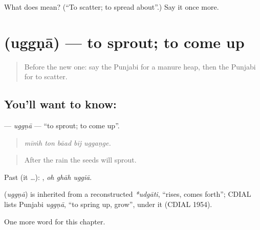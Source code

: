 \begin{tcolorbox}[breakable,colback=teal!4,colframe=teal!35!black,title={Before you move on}]
What does  mean? (\textquotedblleft{}To scatter; to spread about\textquotedblright{}.) Say it once more.
\end{tcolorbox}
\section[\texorpdfstring{\pa{ਉੱਗਣਾ} (uggṇā)}{ਉੱਗਣਾ (uggṇā)}]{ (uggṇā) — to sprout; to come up}

\label{lesson:PA-C302-uggna}



\begin{quote}
Before the new one: say the Punjabi for a manure heap, then the Punjabi for to scatter.
\end{quote}

\subsection*{You'll want to know: }
\textbf{} — \emph{uggṇā} — \textquotedblleft{}to sprout; to come up\textquotedblright{}.

\begin{quote}
    
\end{quote}

\begin{quote}
\emph{mīṁh ton bāad bīj uggaṇge.}
\end{quote}

\begin{quote}
After the rain the seeds will sprout.
\end{quote}

Past (it …):   , \emph{oh ghāh uggiā}.

\begin{cousinweb}
\textbf{} (\emph{uggṇā}) is inherited from a reconstructed \emph{*udgāti}, \textquotedblleft{}rises, comes forth\textquotedblright{}; CDIAL lists Punjabi \emph{uggṇā}, \textquotedblleft{}to spring up, grow\textquotedblright{}, under it (CDIAL 1954).
\end{cousinweb}

\begin{grammarlens}[title={What you've built}]
One more word for this chapter.
\end{grammarlens}


